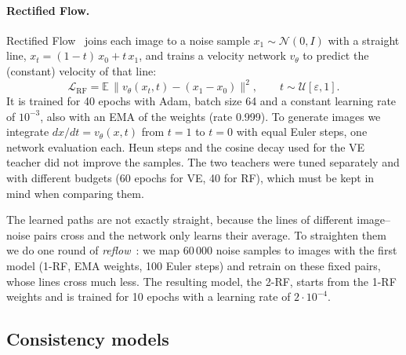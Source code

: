 \documentclass{article}
\begin{document}
\paragraph{Rectified Flow.} Rectified Flow~\cite{liu2023flow} joins each image
to a noise sample $x_1 \sim \mathcal{N}(0, I)$ with a straight line,
$x_t = (1 - t)\, x_0 + t\, x_1$, and trains a velocity network $v_\theta$ to
predict the (constant) velocity of that line:
\begin{equation}
  \mathcal{L}_\text{RF} = \mathbb{E}\,\big\| v_\theta(x_t, t) - (x_1 - x_0) \big\|^2,
  \qquad t \sim \mathcal{U}[\varepsilon, 1].
\end{equation}
It is trained for 40 epochs with Adam, batch size 64 and a constant learning
rate of $10^{-3}$, also with an EMA of the weights (rate 0.999). To generate
images we integrate $dx/dt = v_\theta(x, t)$ from $t = 1$ to $t = 0$ with equal
Euler steps, one network evaluation each. Heun steps and the cosine decay used
for the VE teacher did not improve the samples. The two teachers were tuned
separately and with different budgets (60 epochs for VE, 40 for RF), which must
be kept in mind when comparing them.

The learned paths are not exactly straight, because the lines of different
image--noise pairs cross and the network only learns their average. To
straighten them we do one round of \emph{reflow}~\cite{liu2023flow}: we map
60\,000 noise samples to images with the first model (1-RF, EMA weights, 100
Euler steps) and retrain on these fixed pairs, whose lines cross much less. The
resulting model, the 2-RF, starts from the 1-RF weights and is trained for 10
epochs with a learning rate of $2\cdot10^{-4}$.

\subsection{Consistency models}
\label{sec:cm}
\end{document}
